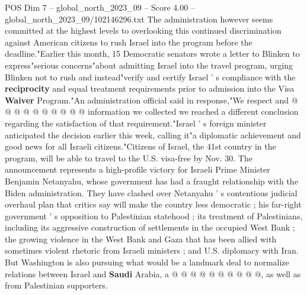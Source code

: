 \begin{textsample}{POS Dim 7 – global\_north\_2023\_09 – Score 4.00 – global\_north\_2023\_09/102146296.txt}
The administration however seems committed at the highest levels to overlooking this continued discrimination against American citizens to rush Israel into the program before the deadline."Earlier this month, 15 Democratic senators wrote a letter to Blinken to express"serious concerns"about admitting Israel into the travel program, urging Blinken not to rush and instead"verify and certify Israel ' s compliance with the \textbf{reciprocity} and equal treatment requirements prior to admission into the Visa \textbf{Waiver} Program."An administration official said in response,"We respect and @ @ @ @ @ @ @ @ @ @ information we collected we reached a different conclusion regarding the satisfaction of that requirement."Israel ' s foreign minister anticipated the decision earlier this week, calling it"a diplomatic achievement and good news for all Israeli citizens."Citizens of Israel, the 41st country in the program, will be able to travel to the U.S. visa-free by Nov. 30.
The announcement represents a high-profile victory for Israeli Prime Minister Benjamin Netanyahu, whose government has had a fraught relationship with the Biden administration.
They have clashed over Netanyahu ' s contentious judicial overhaul plan that critics say will make the country less democratic ; his far-right government ' s opposition to Palestinian statehood ; its treatment of Palestinians, including its aggressive construction of settlements in the occupied West Bank ; the growing violence in the West Bank and Gaza that has been allied with sometimes violent rhetoric from Israeli ministers ; and U.S. diplomacy with Iran.
But Washington is also pursuing what would be a landmark deal to normalize relations between Israel and \textbf{Saudi} Arabia, a @ @ @ @ @ @ @ @ @ @, as well as from Palestinian supporters.

\end{textsample}
